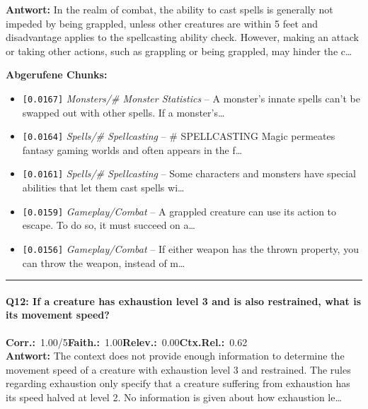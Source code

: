 \noindent\textbf{Antwort:} In the realm of combat, the ability to cast spells is generally not impeded by being grappled, unless other creatures are within 5 feet and disadvantage applies to the spellcasting ability check. However, making an attack or taking other actions, such as grappling or being grappled, may hinder the c\ldots

\noindent\textbf{Abgerufene Chunks:}
\begin{itemize}[noitemsep, topsep=2pt]
  \item[\textbf{\#1}] \texttt{[0.0167]} \textit{Monsters/# Monster Statistics} -- A monster's innate spells can't be swapped out with other spells. If a monster's\ldots
  \item[\textbf{\#2}] \texttt{[0.0164]} \textit{Spells/# Spellcasting} -- \# SPELLCASTING  Magic permeates fantasy gaming worlds and often appears in the f\ldots
  \item[\textbf{\#3}] \texttt{[0.0161]} \textit{Spells/# Spellcasting} -- Some characters and monsters have special abilities that let them cast spells wi\ldots
  \item[\textbf{\#4}] \texttt{[0.0159]} \textit{Gameplay/Combat} -- A grappled creature can use its action to escape. To do so, it must succeed on a\ldots
  \item[\textbf{\#5}] \texttt{[0.0156]} \textit{Gameplay/Combat} -- If either weapon has the thrown property, you can throw the weapon, instead of m\ldots
\end{itemize}
\vspace{4pt}
\hrule
\vspace{6pt}

\paragraph{Q12: If a creature has exhaustion level 3 and is also restrained, what is its movement speed?}
\noindent \textbf{Corr.:}~1.00/5\quad \textbf{Faith.:}~1.00\quad \textbf{Relev.:}~0.00\quad \textbf{Ctx.Rel.:}~0.62\\

\noindent\textbf{Antwort:} The context does not provide enough information to determine the movement speed of a creature with exhaustion level 3 and restrained. The rules regarding exhaustion only specify that a creature suffering from exhaustion has its speed halved at level 2. No information is given about how exhaustion le\ldots

